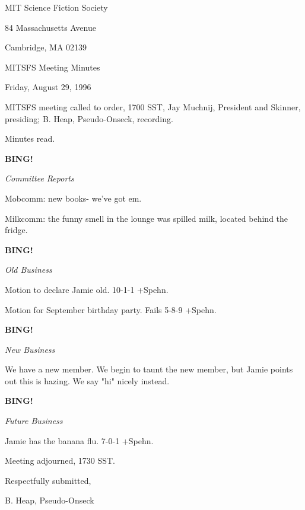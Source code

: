 \documentclass[12pt]{article}
\newcommand{\bing}{{\bf BING!} }
\newcommand{\goto}[1]{\bing \vskip 12pt \centerline{{\em{#1}}}}
\begin{document}
\begin{center}

MIT Science Fiction Society 

84 Massachusetts Avenue

Cambridge, MA 02139

\vspace{12pt}

MITSFS Meeting Minutes 

Friday, August 29, 1996

\end{center}
 
\vspace{18pt}

\setlength{\parskip}{6pt}

\noindent
MITSFS meeting called to order, 1700 SST,
Jay Muchnij, President and Skinner, presiding; B. Heap, Pseudo-Onseck, recording.

Minutes read.

\goto{Committee Reports}

Mobcomm: new books- we've got em.

Milkcomm: the funny smell in the lounge was spilled milk, located behind the fridge.

\goto{Old Business}

Motion to declare Jamie old. 10-1-1 +Spehn.

Motion for September birthday party. Fails 5-8-9 +Spehn.

\goto{New Business}

We have a new member. We begin to taunt the new member, but Jamie points out this is hazing. We say "hi" nicely instead.

\goto{Future Business}

Jamie has the banana flu. 7-0-1 +Spehn.

\vspace{12pt}

\noindent
Meeting adjourned, 1730 SST.

\vspace{18pt}

\centerline{Respectfully submitted,}
\centerline{B. Heap, Pseudo-Onseck}
\end{document}
